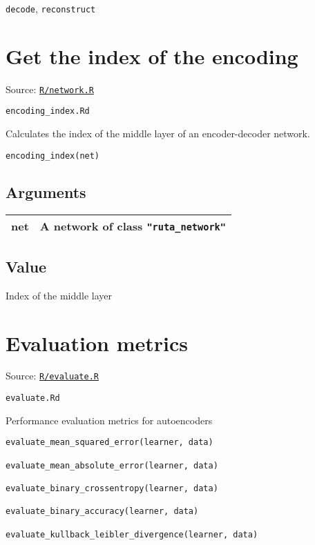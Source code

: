 \texttt{decode}, \texttt{reconstruct}

\section{Get the index of the
encoding}\label{get-the-index-of-the-encoding}

Source:
\href{https://github.com/fdavidcl/ruta/blob/master/R/network.R}{\texttt{R/network.R}}

\texttt{encoding\_index.Rd}

Calculates the index of the middle layer of an encoder-decoder network.

\begin{verbatim}
encoding_index(net)
\end{verbatim}

\hypertarget{arguments}{\subsection{\texorpdfstring{\protect\hyperlink{arguments}{}Arguments}{Arguments}}\label{arguments}}

\begin{longtable}[c]{@{}ll@{}}
\toprule
net & A network of class \texttt{"ruta\_network"}\tabularnewline
\bottomrule
\end{longtable}

\hypertarget{value}{\subsection{\texorpdfstring{\protect\hyperlink{value}{}Value}{Value}}\label{value}}

Index of the middle layer

\section{Evaluation metrics}\label{evaluation-metrics}

Source:
\href{https://github.com/fdavidcl/ruta/blob/master/R/evaluate.R}{\texttt{R/evaluate.R}}

\texttt{evaluate.Rd}

Performance evaluation metrics for autoencoders

\begin{verbatim}
evaluate_mean_squared_error(learner, data)

evaluate_mean_absolute_error(learner, data)

evaluate_binary_crossentropy(learner, data)

evaluate_binary_accuracy(learner, data)

evaluate_kullback_leibler_divergence(learner, data)
\end{verbatim}

